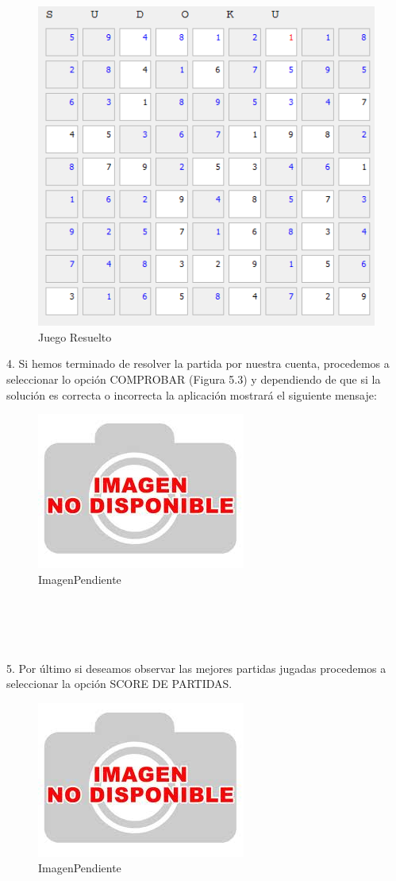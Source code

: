 \begin{figure}[htbp]
\begin{center}
\includegraphics[width=.50\textwidth]{./imagenes/JuegoResuelto.png}
\caption{Juego Resuelto}
\label{Juego Resuelto}
\end{center}
\end{figure}

4. Si hemos terminado de resolver la partida por nuestra cuenta, procedemos a seleccionar lo opción COMPROBAR (Figura 5.3) y dependiendo de que si la solución es correcta o incorrecta la aplicación mostrará el siguiente mensaje:

\begin{figure}[htbp]
\begin{center}
\includegraphics[width=.50\textwidth]{./imagenes/NoDisponible.png}
\caption{ImagenPendiente}
\label{ImagenPendiente}
\end{center}
\end{figure}

\ \\ \ \\ \ \\ \ \\

5. Por último si deseamos observar las mejores partidas jugadas procedemos a seleccionar la opción SCORE DE PARTIDAS.

\begin{figure}[htbp]
\begin{center}
\includegraphics[width=.50\textwidth]{./imagenes/NoDisponible.png}
\caption{ImagenPendiente}
\label{ImagenPendiente}
\end{center}
\end{figure}


